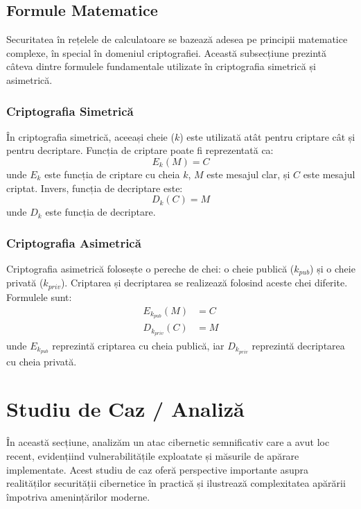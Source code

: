 \documentclass[12pt]{article}
\begin{document}
\newpage
\subsection{Formule Matematice}
Securitatea în rețelele de calculatoare se bazează adesea pe principii matematice complexe, în special în domeniul criptografiei. Această subsecțiune prezintă câteva dintre formulele fundamentale utilizate în criptografia simetrică și asimetrică.

\subsubsection{Criptografia Simetrică}
În criptografia simetrică, aceeași cheie (\( k \)) este utilizată atât pentru criptare cât și pentru decriptare. Funcția de criptare poate fi reprezentată ca:
\begin{equation}
    E_k(M) = C
\end{equation}
unde \( E_k \) este funcția de criptare cu cheia \( k \), \( M \) este mesajul clar, și \( C \) este mesajul criptat. Invers, funcția de decriptare este:
\begin{equation}
    D_k(C) = M 
\end{equation}
unde \( D_k \) este funcția de decriptare.

\subsubsection{Criptografia Asimetrică}
Criptografia asimetrică folosește o pereche de chei: o cheie publică (\( k_{pub} \)) și o cheie privată (\( k_{priv} \)). Criptarea și decriptarea se realizează folosind aceste chei diferite. Formulele sunt:
\begin{align}
    E_{k_{pub}}(M) &= C \\
    D_{k_{priv}}(C) &= M
\end{align}
unde \( E_{k_{pub}} \) reprezintă criptarea cu cheia publică, iar \( D_{k_{priv}} \) reprezintă decriptarea cu cheia privată.

\newpage
\section{Studiu de Caz / Analiză}
În această secțiune, analizăm un atac cibernetic semnificativ care a avut loc recent, evidențiind vulnerabilitățile exploatate și măsurile de apărare implementate. Acest studiu de caz oferă perspective importante asupra realităților securității cibernetice în practică și ilustrează complexitatea apărării împotriva amenințărilor moderne.
\end{document}
